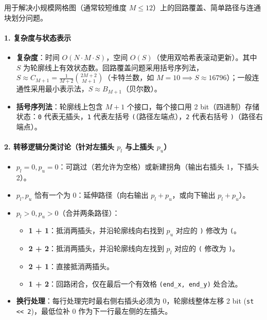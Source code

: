 \noindent
用于解决小规模网格图（通常较短维度 $M \le 12$）上的回路覆盖、简单路径与连通块划分问题。

\paragraph{1. 复杂度与状态表示}
\begin{itemize}
    \item \textbf{复杂度}：时间 $O(N \cdot M \cdot S)$，空间 $O(S)$（使用双哈希表滚动更新）。其中 $S$ 为轮廓线上有效状态数。回路覆盖问题采用括号序列法，$S \approx C_{M+1} = \frac{1}{M+2}\binom{2M+2}{M+1}$（卡特兰数，如 $M=10 \implies S \approx 16796$）；一般连通性采用最小表示法，$S \approx B_{M+1}$（贝尔数）。
    \item \textbf{括号序列法}：轮廓线上包含 $M+1$ 个接口，每个接口用 2 bit（四进制）存储状态：\texttt{0} 代表无插头，\texttt{1} 代表左括号 \texttt{(}（路径左端点），\texttt{2} 代表右括号 \texttt{)}（路径右端点）。
\end{itemize}

\paragraph{2. 转移逻辑分类讨论（针对左插头 $p_l$ 与上插头 $p_u$）}
\begin{itemize}
    \item $p_l = 0, p_u = 0$：可跳过（若允许为空格）或新建拐角（输出右插头 1，下插头 2）。
    \item $p_l, p_u$ 恰有一个为 $0$：延伸路径（向右输出 $p_l+p_u$，或向下输出 $p_l+p_u$）。
    \item $p_l > 0, p_u > 0$（合并两条路径）：
    \begin{itemize}
        \item \textbf{1 + 1}：抵消两插头，并沿轮廓线向右找到 $p_u$ 对应的 \texttt{)} 修改为 \texttt{(}。
        \item \textbf{2 + 2}：抵消两插头，并沿轮廓线向左找到 $p_l$ 对应的 \texttt{(} 修改为 \texttt{)}。
        \item \textbf{2 + 1}：直接抵消两插头。
        \item \textbf{1 + 2}：回路闭合，仅在最后一个有效格 \texttt{(end\_x, end\_y)} 处合法。
    \end{itemize}
    \item \textbf{换行处理}：每行处理完时最右侧右插头必须为 0，轮廓线整体左移 2 bit (\texttt{st << 2})，最低位补 0 作为下一行最左侧的左插头。
\end{itemize}
